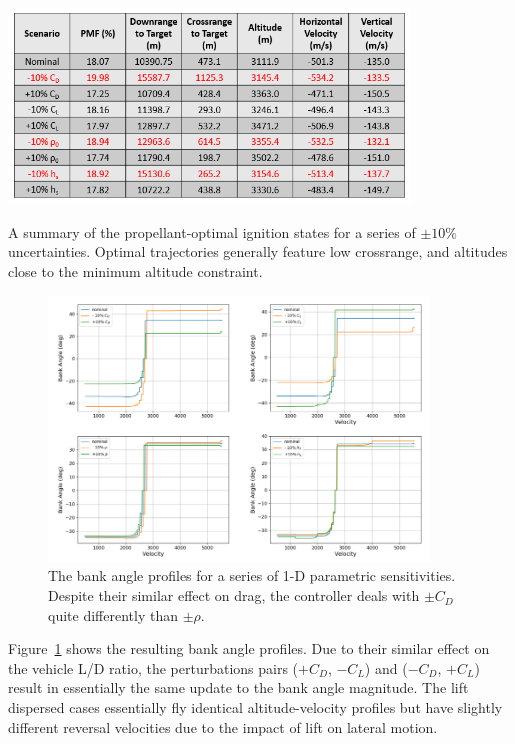 \begin{table}[h!]
	\centering
	\includegraphics[width=0.8\textwidth]{../AAS20/ParametricSensitivityIgnitionTable} 
	\caption{A summary of the propellant-optimal ignition states for a series of $\pm10\%$ uncertainties. Optimal trajectories generally feature low crossrange, and altitudes close to the minimum altitude constraint.}
	\label{table_parametric_ignition}
\end{table}
\begin{figure}[h!]
	\centering
	\includegraphics[width=0.9\textwidth]{../AAS20/SensitivityBankProfiles} 
	\caption{The bank angle profiles for a series of 1-D parametric sensitivities. Despite their similar effect on drag, the controller deals with $\pm C_D$ quite differently than $\pm \rho$.}
	\label{fig_parametric_bank}
\end{figure}

Figure~\ref{fig_parametric_bank} shows the resulting bank angle profiles. Due to their similar effect on the vehicle L/D ratio, the perturbations pairs  ($ +C_D $, $ -C_L $) and ($ -C_D $, $ +C_L $) result in essentially the same update to the bank angle magnitude. The lift dispersed cases essentially fly identical altitude-velocity profiles but have slightly different reversal velocities due to the impact of lift on lateral motion. 

